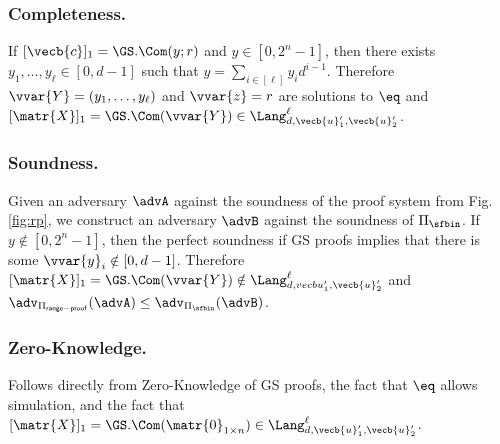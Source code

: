 \subsubsection{Completeness.}
If $[\vecb{c}]_1=\GS.\Com(y;r)$ and $y\in[0,2^n-1]$, then there exists $y_1,\ldots,y_\ell\in[0,d-1]$  such that $y=\sum_{i\in[\ell]}y_id^{i-1}$. Therefore $\vvar{Y}=(y_1,\ldots,y_\ell)$ and $\vvar{z}=r$ are solutions to $\eq$ and $[\matr{X}]_1=\GS.\Com(\vvar{Y})\in\Lang_{d,\vecb{u}'_1,\vecb{u}'_2}^\ell$.

\subsubsection{Soundness.}
Given an adversary $\advA$ against the soundness of the proof system from Fig. \ref{fig:rp}, we construct an adversary $\advB$ against the soundness of $\Pi_\sfbin$. If $y\notin[0,2^n-1]$, then the perfect soundness if GS proofs implies that there is some $\vvar{y}_i\notin[0,d-1]$. Therefore $[\matr{X}]_1=\GS.\Com(\vvar{Y})\notin\Lang_{d,vecb{u}'_1,\vecb{u}'_2}^\ell$ and $\adv_{\Pi_\mathsf{range-proof}}(\advA)\leq\adv_{\Pi_\sfbin}(\advB)$.

\subsubsection{Zero-Knowledge.} Follows directly from Zero-Knowledge of GS proofs, the fact that $\eq$ allows simulation, and the fact that $[\matr{X}]_1=\GS.\Com(\matr{0}_{1\times n})\in\Lang_{d,\vecb{u}'_1,\vecb{u}'_2}^\ell$.
